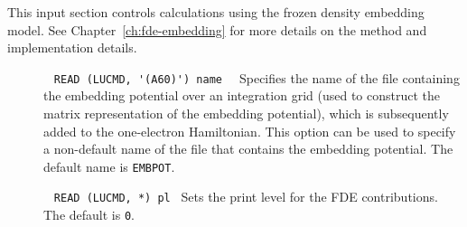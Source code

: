 This input section controls calculations using the frozen density embedding model.
See Chapter~\ref{ch:fde-embedding} for more details on the method and implementation details.

\begin{description}

\item[]\verb| |\newline
\verb|READ (LUCMD, '(A60)') name |\verb| |\newline
Specifies the name of the file containing the embedding potential over an integration grid (used to construct
the matrix representation of the embedding potential), which is subsequently added to the one-electron Hamiltonian.
This option can be used to specify a non-default name of the file that contains the embedding potential. The default name is \verb|EMBPOT|.

%
%
%
\item[]\verb| |\newline
\verb|READ (LUCMD, *) pl|\verb| |\newline
Sets the print level for the FDE contributions. The default is \verb|0|.

\end{description}


